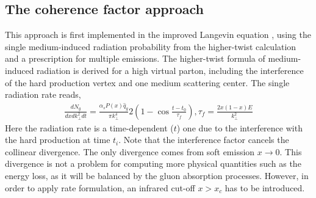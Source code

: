 \subsection{The coherence factor approach}
This approach is first implemented in the improved Langevin equation \cite{Cao:2013ita}, using the single medium-induced radiation probability from the higher-twist calculation \cite{Majumder:2009ge,Wang:2001ifa} and a prescription for multiple emissions.
The higher-twist formula of medium-induced radiation is derived for a high virtual parton, including the interference of the hard production vertex and one medium scattering center.
The single radiation rate reads,
\begin{eqnarray}
\frac{dN_g}{dx dk_\perp^2 dt} = \frac{\alpha_s P(x)\hat{q}_g}{\pi k_\perp^4} 2\left(1-\cos\frac{t-t_0}{\tau_f}\right), \tau_f = \frac{2x(1-x)E}{k_\perp^2}
\end{eqnarray}
Here the radiation rate is a time-dependent ($t$) one due to the interference with the hard production at time $t_i$. 
Note that the interference factor cancels the collinear divergence. 
The only divergence comes from soft emission $x\rightarrow 0$. 
This divergence is not a problem for computing more physical quantities such as the energy loss, as it will be balanced by the gluon absorption processes.
However, in order to apply rate formulation, an infrared cut-off $x>x_c$ has to be introduced. 

